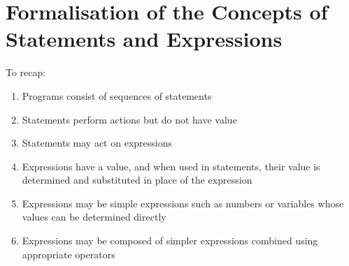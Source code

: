 \section{Formalisation of the Concepts of Statements and Expressions}

To recap:
\begin{enumerate}
	\item Programs consist of sequences of statements
	\item Statements perform actions but do not have value
	\item Statements may act on expressions
	\item Expressions have a value, and when used in statements, their value is determined and substituted in place of the expression
	\item Expressions may be simple expressions such as numbers or variables whose values can be determined directly
	\item Expressions may be composed of simpler expressions combined using appropriate operators
\end{enumerate}

